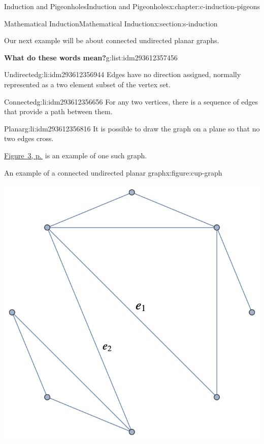 \documentclass[twoside,10pt,]{book}
\numberwithin{equation}{section}
\begin{document}
\begin{chapterptx}{Induction and Pigeonholes}{}{Induction and Pigeonholes}{}{}{x:chapter:c-induction-pigeons}
\begin{sectionptx}{Mathematical Induction}{}{Mathematical Induction}{}{}{x:section:s-induction}
\par
Our next example will be about connected undirected planar graphs.%
\begin{listptx}{\textbf{What do these words mean?}}{g:list:idm293612357456}{}%
%
\begin{descriptionlist}
\begin{dlimedium}{Undirected}{g:li:idm293612356944}%
Edges have no direction assigned, normally represented as a two element subset of the vertex set.%
\end{dlimedium}%
\begin{dlimedium}{Connected}{g:li:idm293612356656}%
For any two vertices, there is a sequence of edges that provide a path between them.%
\end{dlimedium}%
\begin{dlimedium}{Planar}{g:li:idm293612356816}%
It is possible to draw the graph on a plane so that no two edges cross.%
\end{dlimedium}%
\end{descriptionlist}
\end{listptx}%
\hyperref[x:figure:cup-graph]{Figure~3, p.\,\pageref{x:figure:cup-graph}} is an example of one such graph.%
\begin{figureptx}{An example of a connected undirected planar graph}{x:figure:cup-graph}{}%
\begin{image}{0}{1}{0}%
\includegraphics[width=\linewidth]{images/cup-graph.png}

\end{image}
\end{figureptx}
\end{sectionptx}
\end{chapterptx}
\end{document}

